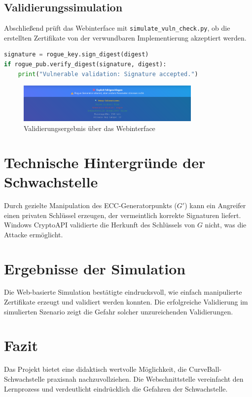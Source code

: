 \documentclass{article}
\begin{document}
\subsection{Validierungssimulation}
Abschließend prüft das Webinterface mit \texttt{simulate\_vuln\_check.py}, ob die erstellten Zertifikate von der verwundbaren Implementierung akzeptiert werden.

\begin{lstlisting}[language=python,caption={Simulationsprüfung}]
signature = rogue_key.sign_digest(digest)
if rogue_pub.verify_digest(signature, digest):
    print("Vulnerable validation: Signature accepted.")
\end{lstlisting}

\begin{figure}[h]
\centering
\includegraphics[width=0.8\textwidth]{webinterface_validation.png}
\caption{Validierungsergebnis über das Webinterface}
\end{figure}

\section{Technische Hintergründe der Schwachstelle}
Durch gezielte Manipulation des ECC-Generatorpunkts ($G'$) kann ein Angreifer einen privaten Schlüssel erzeugen, der vermeintlich korrekte Signaturen liefert. Windows CryptoAPI validierte die Herkunft des Schlüssels von $G$ nicht, was die Attacke ermöglicht.

\section{Ergebnisse der Simulation}
Die Web-basierte Simulation bestätigte eindrucksvoll, wie einfach manipulierte Zertifikate erzeugt und validiert werden konnten. Die erfolgreiche Validierung im simulierten Szenario zeigt die Gefahr solcher unzureichenden Validierungen.

\section{Fazit}
Das Projekt bietet eine didaktisch wertvolle Möglichkeit, die CurveBall-Schwachstelle praxisnah nachzuvollziehen. Die Webschnittstelle vereinfacht den Lernprozess und verdeutlicht eindrücklich die Gefahren der Schwachstelle.
\end{document}
